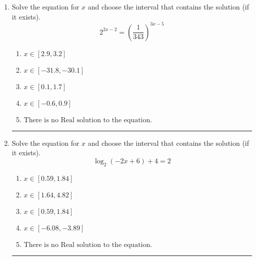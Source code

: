 \documentclass[14pt]{extbook}
\newcommand{\litem}[1]{\item#1\hspace*{-1cm}\rule{\textwidth}{0.4pt}}
\begin{document}
\begin{enumerate}
{\begin{enumerate}[label=\Alph*.]
\end{enumerate} }
\litem{
Solve the equation for $x$ and choose the interval that contains the solution (if it exists).\[ 2^{2x-2} = \left(\frac{1}{343}\right)^{3x-5} \]\begin{enumerate}[label=\Alph*.]
\item \( x \in [2.9, 3.2] \)
\item \( x \in [-31.8, -30.1] \)
\item \( x \in [0.1, 1.7] \)
\item \( x \in [-0.6, 0.9] \)
\item \( \text{There is no Real solution to the equation.} \)

\end{enumerate} }
\litem{
Solve the equation for $x$ and choose the interval that contains the solution (if it exists).\[ \log_{2}{(-2x+6)}+4 = 2 \]\begin{enumerate}[label=\Alph*.]
\item \( x \in [0.59, 1.84] \)
\item \( x \in [1.64, 4.82] \)
\item \( x \in [0.59, 1.84] \)
\item \( x \in [-6.08, -3.89] \)
\item \( \text{There is no Real solution to the equation.} \)

\end{enumerate} }
\end{enumerate}
\end{document}
